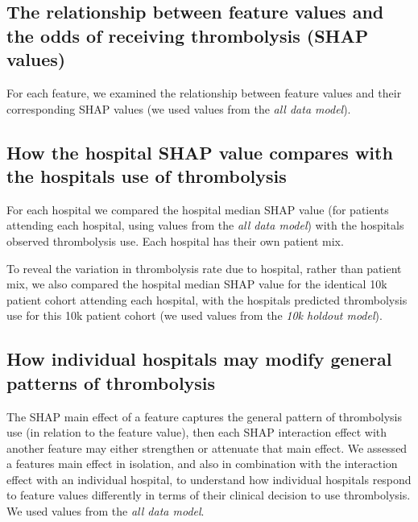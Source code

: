 \subsection{The relationship between feature values and the odds of receiving thrombolysis (SHAP values)}

For each feature, we examined the relationship between feature values and their corresponding SHAP values (we used values from the \emph{all data model}).




\subsection{How the hospital SHAP value compares with the hospitals use of thrombolysis}

For each hospital we compared the hospital median SHAP value (for patients attending each hospital, using values from the \emph{all data model}) with the hospitals observed thrombolysis use. Each hospital has their own patient mix.

To reveal the variation in thrombolysis rate due to hospital, rather than patient mix, we also compared the hospital median SHAP value for the identical 10k patient cohort attending each hospital, with the hospitals predicted thrombolysis use for this 10k patient cohort (we used values from the \emph{10k holdout model}).



\subsection{How individual hospitals may modify general patterns of thrombolysis}

The SHAP main effect of a feature captures the general pattern of thrombolysis use (in relation to the feature value), then each SHAP interaction effect with another feature may either strengthen or attenuate that main effect. We assessed a features main effect in isolation, and also in combination with the interaction effect with an individual hospital, to understand how individual hospitals respond to feature values differently in terms of their clinical decision to use thrombolysis. We used values from the \emph{all data model}.

